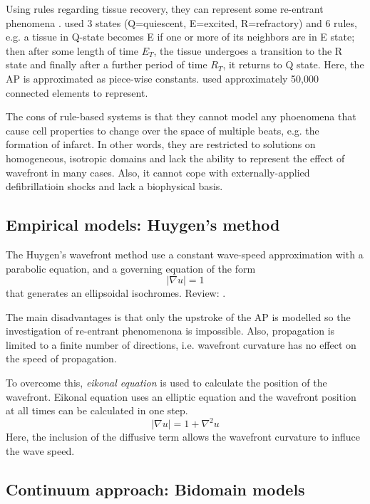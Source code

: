 Using rules regarding tissue recovery, they can represent some re-entrant
phenomena \citep{mitchell1992}. \citep{bailie1990} used 3 states (Q=quiescent,
E=excited, R=refractory) and 6 rules, e.g. a tissue in Q-state becomes E if one
or more of its neighbors are in E state; then after some length of time $E_T$,
the tissue undergoes a transition to the R state and finally after a further
period of time $R_T$, it returns to Q state. Here, the AP is approximated as
piece-wise constants. \citep{wei1995} used approximately 50,000 connected
elements to represent. 


The cons of rule-based systems is that they cannot model any phoenomena that
cause cell properties to change over the space of multiple beats, e.g. the
formation of infarct. In other words, they are restricted to solutions on
homogeneous, isotropic domains and lack the ability to represent the effect of
wavefront in many cases. Also, it cannot cope with externally-applied
defibrillatioin shocks and lack a biophysical basis.

\subsection{Empirical models: Huygen's method}

The Huygen's wavefront method use a constant wave-speed approximation with
a parabolic equation, and a governing equation of the form
\begin{equation}
|\nabla u|  = 1
\end{equation}
that generates an ellipsoidal isochromes. Review: \citep{plonsey1987}.

The main disadvantages is that only the upstroke of the AP is modelled so the
investigation of re-entrant phenomenona is impossible. Also, propagation is
limited to a finite number of directions, i.e. wavefront curvature has no effect
on the speed of propagation.

To overcome this, {\it eikonal equation} is used to calculate the position of
the wavefront. Eikonal equation uses an elliptic equation and the wavefront
position at all times can be calculated in one step.
\begin{equation}
| \nabla u | = 1 + \nabla^2 u
\end{equation}
Here, the inclusion of the diffusive term allows the wavefront curvature to
influce the wave speed.

\subsection{Continuum approach: Bidomain models}

